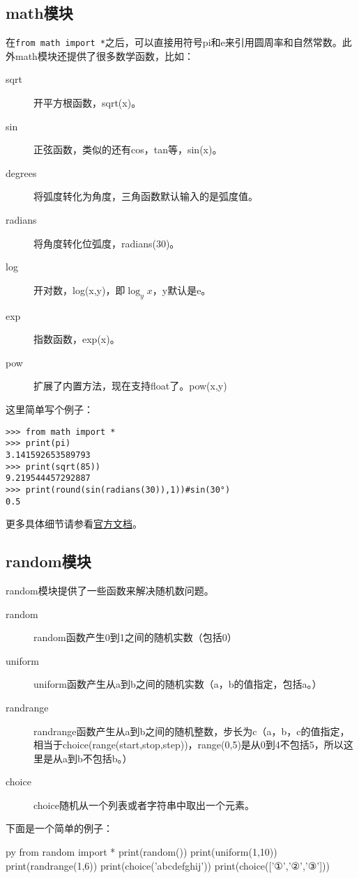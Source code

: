 \documentclass[12pt,oneside]{book}
\begin{document}
\begin{common-format}
\subsection{math模块}
在\verb+from math import *+之后，可以直接用符号pi和e来引用圆周率和自然常数。此外math模块还提供了很多数学函数，比如：
\begin{description}
\item[sqrt] 开平方根函数，sqrt(x)。
\item[sin] 正弦函数，类似的还有cos，tan等，sin(x)。
\item[degrees] 将弧度转化为角度，三角函数默认输入的是弧度值。
\item[radians] 将角度转化位弧度，radians(30)。 
\item[log] 开对数，log(x,y)，即$\log_y x$，y默认是e。
\item[exp] 指数函数，exp(x)。
\item[pow] 扩展了内置方法，现在支持float了。pow(x,y)
\end{description}

这里简单写个例子：
\begin{Verbatim}
>>> from math import *
>>> print(pi)
3.141592653589793
>>> print(sqrt(85))
9.219544457292887
>>> print(round(sin(radians(30)),1))#sin(30°)
0.5
\end{Verbatim}


更多具体细节请参看\href{http://docs.python.org/3.4/library/math.html}{官方文档}。




\subsection{random模块}
random模块提供了一些函数来解决随机数问题。%
\begin{description}
\item[random] random函数产生0到1之间的随机实数（包括0）
\item[uniform] uniform函数产生从a到b之间的随机实数（a，b的值指定，包括a。）
\item[randrange] randrange函数产生从a到b之间的随机整数，步长为c（a，b，c的值指定，相当于choice(range(start,stop,step))，range(0,5)是从0到4不包括5，所以这里是从a到b不包括b。）
\item[choice] choice随机从一个列表或者字符串中取出一个元素。
\end{description}

下面是一个简单的例子：
\begin{xverbatim}[129]{py}
from random import *
print(random())
print(uniform(1,10))
print(randrange(1,6))
print(choice('abcdefghij'))
print(choice(['①','②','③']))
\end{xverbatim}


\end{common-format}
\end{document}
